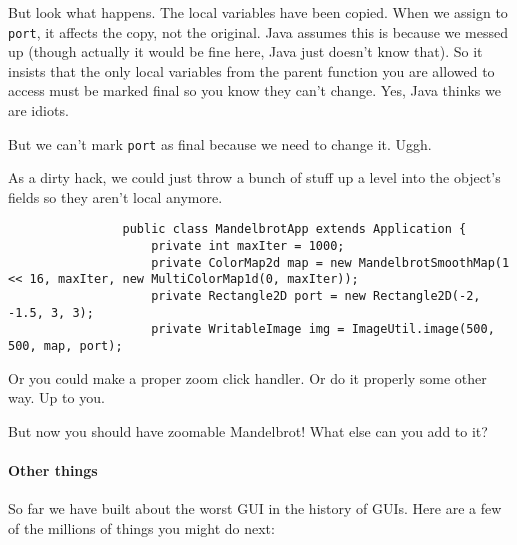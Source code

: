 \documentclass{article}
\begin{document}
            But look what happens. The local variables have been copied. When we assign to \texttt{port}, it affects the copy, not the
            original. Java assumes this is because we messed up (though actually it would be fine here, Java just doesn't know that). So it
            insists that the only local variables from the parent function you are allowed to access must be marked final so you know they
            can't change. Yes, Java thinks we are idiots.
            
            But we can't mark \texttt{port} as final because we need to change it. Uggh.
            
            As a dirty hack, we could just throw a bunch of stuff up a level into the object's fields so they aren't local anymore.
            
            \begin{verbatim}
                public class MandelbrotApp extends Application {
                    private int maxIter = 1000;
                    private ColorMap2d map = new MandelbrotSmoothMap(1 << 16, maxIter, new MultiColorMap1d(0, maxIter));
                    private Rectangle2D port = new Rectangle2D(-2, -1.5, 3, 3);
                    private WritableImage img = ImageUtil.image(500, 500, map, port);
            \end{verbatim}
            
            Or you could make a proper zoom click handler. Or do it properly some other way.  Up to you.
            
            But now you should have zoomable Mandelbrot!  What else can you add to it?

        \paragraph{Other things}
            So far we have built about the worst GUI in the history of GUIs.  Here are a few of the millions of things you might do next:
            
\end{document}
